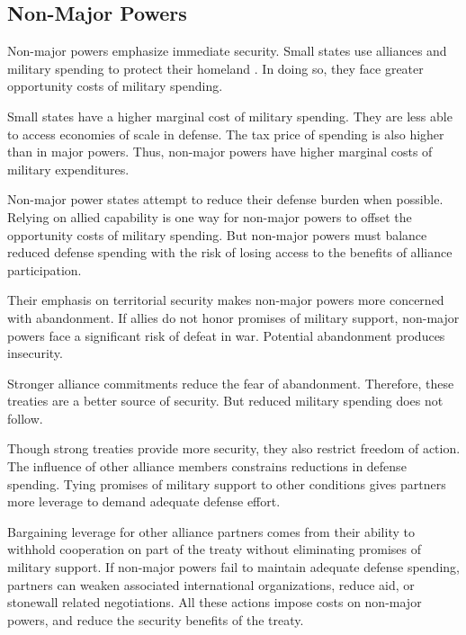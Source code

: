 \documentclass[12pt]{article}
\begin{document}
\subsection{Non-Major Powers} 


Non-major powers emphasize immediate security.
Small states use alliances and military spending to protect their homeland \citep{Morrow1991}.  
In doing so, they face greater opportunity costs of military spending. 


Small states have a higher marginal cost of military spending. 
They are less able to access economies of scale in defense. 
The tax price of spending is also higher than in major powers. 
Thus, non-major powers have higher marginal costs of military expenditures. 


Non-major power states attempt to reduce their defense burden when possible.
Relying on allied capability is one way for non-major powers to offset the opportunity costs of military spending.  
But non-major powers must balance reduced defense spending with the risk of losing access to the benefits of alliance participation. 


Their emphasis on territorial security makes non-major powers more concerned with abandonment. 
If allies do not honor promises of military support, non-major powers face a significant risk of defeat in war. 
Potential abandonment produces insecurity. 


Stronger alliance commitments reduce the fear of abandonment. 
Therefore, these treaties are a better source of security. 
But reduced military spending does not follow. 


Though strong treaties provide more security, they also restrict freedom of action. 
The influence of other alliance members constrains reductions in defense spending.
Tying promises of military support to other conditions gives partners more leverage to demand adequate defense effort. 


Bargaining leverage for other alliance partners comes from their ability to withhold cooperation on part of the treaty without eliminating promises of military support. 
If non-major powers fail to maintain adequate defense spending, partners can weaken associated international organizations, reduce aid, or stonewall related negotiations. 
All these actions impose costs on non-major powers, and reduce the security benefits of the treaty. 
\end{document}
